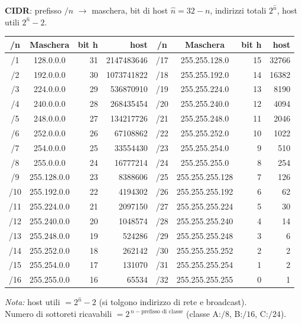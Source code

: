 \documentclass[11pt,a4paper]{report}
\begin{document}
\textbf{CIDR}: prefisso $/n$ $\to$ maschera, bit di host $\hat n=32-n$, indirizzi totali $2^{\hat n}$, host utili $2^{\hat n}-2$.
\footnotesize
\setlength{\tabcolsep}{3pt}
\begin{center}
\begin{tabular}{|c|c|r|r||c|c|r|r|}
\hline
\textbf{/n} & \textbf{Maschera} & \textbf{bit h} & \textbf{host} & \textbf{/n} & \textbf{Maschera} & \textbf{bit h} & \textbf{host} \\ \hline
/1 & 128.0.0.0 & 31 & 2147483646 & /17 & 255.255.128.0 & 15 & 32766 \\
/2 & 192.0.0.0 & 30 & 1073741822 & /18 & 255.255.192.0 & 14 & 16382 \\
/3 & 224.0.0.0 & 29 & 536870910 & /19 & 255.255.224.0 & 13 & 8190 \\
/4 & 240.0.0.0 & 28 & 268435454 & /20 & 255.255.240.0 & 12 & 4094 \\
/5 & 248.0.0.0 & 27 & 134217726 & /21 & 255.255.248.0 & 11 & 2046 \\
/6 & 252.0.0.0 & 26 & 67108862 & /22 & 255.255.252.0 & 10 & 1022 \\
/7 & 254.0.0.0 & 25 & 33554430 & /23 & 255.255.254.0 & 9 & 510 \\
/8 & 255.0.0.0 & 24 & 16777214 & /24 & 255.255.255.0 & 8 & 254 \\
/9 & 255.128.0.0 & 23 & 8388606 & /25 & 255.255.255.128 & 7 & 126 \\
/10 & 255.192.0.0 & 22 & 4194302 & /26 & 255.255.255.192 & 6 & 62 \\
/11 & 255.224.0.0 & 21 & 2097150 & /27 & 255.255.255.224 & 5 & 30 \\
/12 & 255.240.0.0 & 20 & 1048574 & /28 & 255.255.255.240 & 4 & 14 \\
/13 & 255.248.0.0 & 19 & 524286 & /29 & 255.255.255.248 & 3 & 6 \\
/14 & 255.252.0.0 & 18 & 262142 & /30 & 255.255.255.252 & 2 & 2 \\
/15 & 255.254.0.0 & 17 & 131070 & /31 & 255.255.255.254 & 1 & 2 \\
/16 & 255.255.0.0 & 16 & 65534 & /32 & 255.255.255.255 & 0 & 1 \\
\hline
\end{tabular}
\end{center}
\normalsize
\setlength{\tabcolsep}{6pt}
\noindent\emph{Nota:} host utili $=2^{\hat n}-2$ (si tolgono indirizzo di rete e broadcast). \\
Numero di sottoreti ricavabili $=2^{\,n-\text{prefisso di classe}}$ (classe A:$/8$, B:$/16$, C:$/24$).
\end{document}
